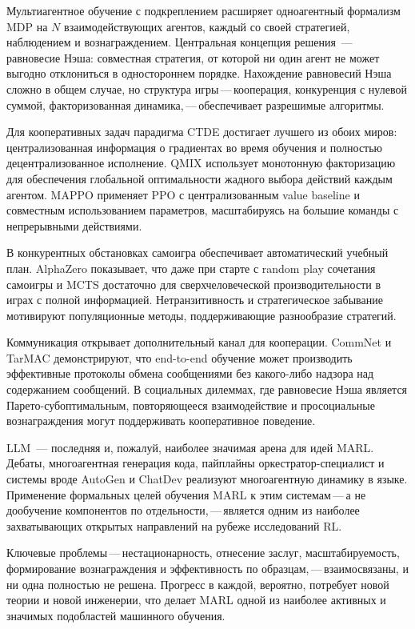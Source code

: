 Мультиагентное обучение с подкреплением расширяет одноагентный формализм MDP
на $N$ взаимодействующих агентов, каждый со своей стратегией,
наблюдением и вознаграждением. Центральная концепция решения~---
равновесие Нэша: совместная стратегия, от которой ни один агент не может выгодно
отклониться в одностороннем порядке. Нахождение равновесий Нэша сложно в общем случае,
но структура игры\,---\,кооперация, конкуренция с нулевой суммой,
факторизованная динамика,\,---\,обеспечивает разрешимые алгоритмы.

Для кооперативных задач парадигма CTDE достигает лучшего из
обоих миров: централизованная информация о градиентах во время обучения и
полностью децентрализованное исполнение. QMIX использует монотонную
факторизацию для обеспечения глобальной оптимальности жадного выбора действий каждым агентом.
MAPPO применяет PPO с централизованным value baseline и
совместным использованием параметров, масштабируясь на большие команды с непрерывными действиями.

В конкурентных обстановках самоигра обеспечивает автоматический учебный план.
AlphaZero показывает, что даже при старте с random play
сочетания самоигры и MCTS достаточно для сверхчеловеческой производительности в
играх с полной информацией. Нетранзитивность и стратегическое забывание
мотивируют популяционные методы, поддерживающие разнообразие стратегий.

Коммуникация открывает дополнительный канал для кооперации.
CommNet и TarMAC демонстрируют, что end-to-end обучение может
производить эффективные протоколы обмена сообщениями без какого-либо надзора
над содержанием сообщений. В социальных дилеммах, где равновесие Нэша
является Парето-субоптимальным, повторяющееся взаимодействие и просоциальные
вознаграждения могут поддерживать кооперативное поведение.

LLM~--- последняя и, пожалуй, наиболее значимая арена для идей MARL.
Дебаты, многоагентная генерация кода, пайплайны оркестратор-специалист
и системы вроде AutoGen и ChatDev реализуют
многоагентную динамику в языке. Применение формальных целей обучения MARL
к этим системам\,---\,а не дообучение компонентов
по отдельности,\,---\,является одним из наиболее захватывающих открытых направлений на
рубеже исследований RL.

Ключевые проблемы\,---\,нестационарность, отнесение заслуг,
масштабируемость, формирование вознаграждения и эффективность по образцам,\,---\,взаимосвязаны, и ни одна полностью не решена. Прогресс в каждой, вероятно,
потребует новой теории и новой инженерии, что делает MARL одной из
наиболее активных и значимых подобластей машинного обучения.


